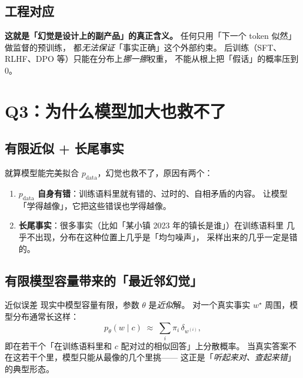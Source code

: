 \documentclass[11pt,a4paper]{ctexart}
\begin{document}
\subsection{工程对应}

\begin{engbox}
\textbf{这就是「幻觉是设计上的副产品」的真正含义。}
任何只用「下一个 token 似然」做监督的预训练，
都\emph{无法保证}「事实正确」这个外部约束。
后训练（SFT、RLHF、DPO 等）只能在分布上\emph{挪一挪}权重，
不能从根上把「假话」的概率压到 0。
\end{engbox}

\section{Q3：为什么模型加大也救不了}

\subsection{有限近似 + 长尾事实}

\begin{intuitionblock}
就算模型能完美拟合 $p_{\text{data}}$，幻觉也救不了，原因有两个：

\begin{enumerate}
  \item \textbf{$p_{\text{data}}$ 自身有错}：训练语料里就有错的、过时的、自相矛盾的内容。
        让模型「学得越像」，它把这些错误也学得越像。
  \item \textbf{长尾事实}：很多事实（比如「某小镇 2023 年的镇长是谁」）在训练语料里
        几乎不出现，分布在这种位置上几乎是「均匀噪声」，
        采样出来的几乎一定是错的。
\end{enumerate}
\end{intuitionblock}

\subsection{有限模型容量带来的「最近邻幻觉」}

\begin{mathbox}{近似误差}
现实中模型容量有限，参数 $\theta$ 是\emph{近似}解。
对一个真实事实 $w^\star$ 周围，模型分布通常长这样：
\[
  p_\theta(w \mid c) \;\approx\; \sum_{i} \pi_i\, \delta_{w^{(i)}},
\]
即在若干个「在训练语料里和 $c$ 配对过的相似回答」上分散概率。
当真实答案不在这若干个里，模型只能从最像的几个里挑——
这正是「\emph{听起来对、查起来错}」的典型形态。
\end{mathbox}
\end{document}
